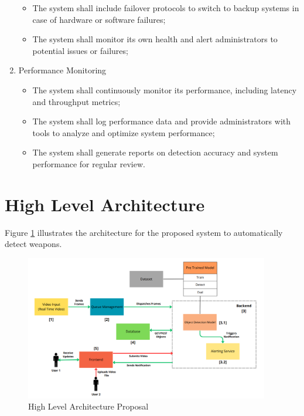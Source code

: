 \begin{enumerate}
    \begin{itemize}
    \item The system shall include failover protocols to switch to backup systems in case of hardware or software failures;
    \item The system shall monitor its own health and alert administrators to potential issues or failures;
    \end{itemize}
    \item Performance Monitoring
    \begin{itemize}
    \item The system shall continuously monitor its performance, including latency and throughput metrics;
    \item The system shall log performance data and provide administrators with tools to analyze and 
    optimize system performance;
    \item The system shall generate reports on detection accuracy and system performance for regular review.
    \end{itemize}
    \end{enumerate}

\section{High Level Architecture}
Figure \ref{fig:architecture-proposal} illustrates the architecture for the proposed system to 
automatically detect weapons. 

\begin{figure}[ht]
    \centering 
    \includegraphics[width=0.95\textwidth]{figs/high-level.png} 
    \caption{High Level Architecture Proposal}
    \label{fig:architecture-proposal}
\end{figure}


